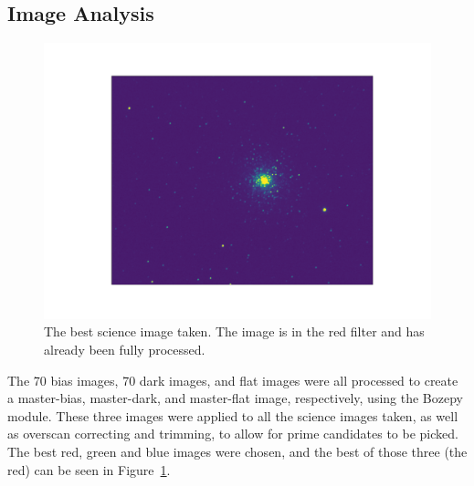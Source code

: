 \documentclass[twoside,11pt]{article}
\begin{document}
\subsection{Image Analysis}
\begin{figure}[ht]
\includegraphics[width=\textwidth]{red_pic.pdf}
\caption{The best science image taken. The image is in the red filter and has already been fully processed.}
\label{fig:red}
\end{figure}

The 70 bias images, 70 dark images, and flat images were all processed to create a master-bias, master-dark, and master-flat image, respectively, using the Bozepy module. These three images were applied to all the science images taken, as well as overscan correcting and trimming, to allow for prime candidates to be picked. The best red, green and blue images were chosen, and the best of those three (the red) can be seen in Figure~\ref{fig:red}.
\end{document}
